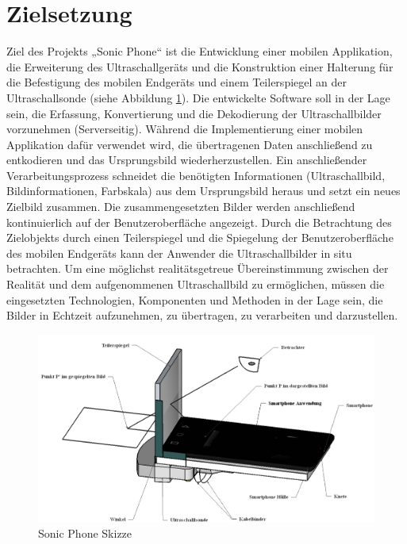 \section{Zielsetzung}
Ziel des Projekts „Sonic Phone“ ist die Entwicklung einer mobilen Applikation, die Erweiterung des Ultraschallgeräts und die Konstruktion einer Halterung für die Befestigung des mobilen Endgeräts und einem Teilerspiegel an der Ultraschallsonde (siehe Abbildung \ref{fig:sonic_phone_skizze}). Die entwickelte Software soll in der Lage sein, die Erfassung, Konvertierung und die Dekodierung der Ultraschallbilder vorzunehmen (Serverseitig). Während die Implementierung einer mobilen Applikation dafür verwendet wird, die übertragenen Daten  anschließend zu entkodieren und das Ursprungsbild wiederherzustellen. Ein anschließender Verarbeitungsprozess schneidet die benötigten Informationen (Ultraschallbild, Bildinformationen, Farbskala) aus dem Ursprungsbild heraus und setzt ein neues Zielbild zusammen. Die zusammengesetzten Bilder werden anschließend kontinuierlich auf der Benutzeroberfläche angezeigt. Durch die Betrachtung des Zielobjekts durch einen Teilerspiegel und die Spiegelung der Benutzeroberfläche des mobilen Endgeräts kann der Anwender die Ultraschallbilder in situ betrachten. Um eine möglichst realitätsgetreue Übereinstimmung zwischen der Realität und dem aufgenommenen Ultraschallbild zu ermöglichen, müssen die eingesetzten Technologien, Komponenten und Methoden in der Lage sein, die Bilder in Echtzeit aufzunehmen, zu übertragen, zu verarbeiten und darzustellen.

\begin{figure}[h]
	\centering
	\includegraphics[width=1\textwidth]{Bilder/Einleitung/SonicPhoneSkizzeQuer.PNG}
	\caption{Sonic Phone Skizze}
	\label{fig:sonic_phone_skizze}
\end{figure}
